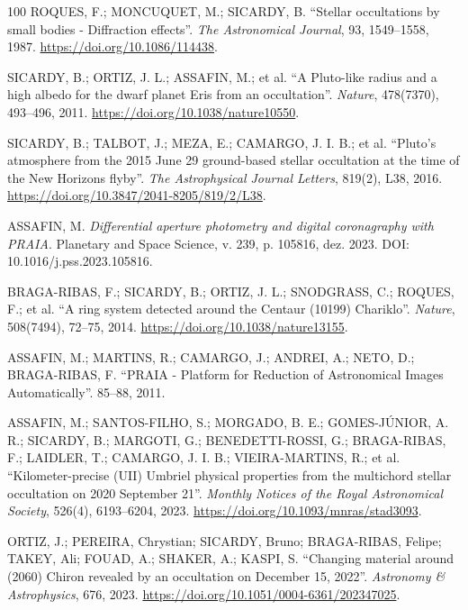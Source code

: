 \documentclass[msc]{on} %
\begin{document}
\begin{thebibliography}{100}
 ROQUES, F.; MONCUQUET, M.; SICARDY, B. ``Stellar occultations by small bodies - Diffraction effects''. \emph{The Astronomical Journal}, 93, 1549--1558, 1987. \url{https://doi.org/10.1086/114438}.

 SICARDY, B.; ORTIZ, J. L.; ASSAFIN, M.; et al. ``A Pluto-like radius and a high albedo for the dwarf planet Eris from an occultation''. \emph{Nature}, 478(7370), 493--496, 2011. \url{https://doi.org/10.1038/nature10550}.

 SICARDY, B.; TALBOT, J.; MEZA, E.; CAMARGO, J. I. B.; et al. ``Pluto's atmosphere from the 2015 June 29 ground-based stellar occultation at the time of the New Horizons flyby''. \emph{The Astrophysical Journal Letters}, 819(2), L38, 2016. \url{https://doi.org/10.3847/2041-8205/819/2/L38}.

 ASSAFIN, M. \textit{Differential aperture photometry and digital coronagraphy with PRAIA}. Planetary and Space Science, v. 239, p. 105816, dez. 2023. DOI: 10.1016/j.pss.2023.105816.

 BRAGA-RIBAS, F.; SICARDY, B.; ORTIZ, J. L.; SNODGRASS, C.; ROQUES, F.; et al. ``A ring system detected around the Centaur (10199) Chariklo''. \emph{Nature}, 508(7494), 72--75, 2014. \url{https://doi.org/10.1038/nature13155}.

 ASSAFIN, M.; MARTINS, R.; CAMARGO, J.; ANDREI, A.; NETO, D.; BRAGA-RIBAS, F. ``PRAIA - Platform for Reduction of Astronomical Images Automatically''. 85--88, 2011.

 ASSAFIN, M.; SANTOS-FILHO, S.; MORGADO, B. E.; GOMES-JÚNIOR, A. R.; SICARDY, B.; MARGOTI, G.; BENEDETTI-ROSSI, G.; BRAGA-RIBAS, F.; LAIDLER, T.; CAMARGO, J. I. B.; VIEIRA-MARTINS, R.; et al. ``Kilometer-precise (UII) Umbriel physical properties from the multichord stellar occultation on 2020 September 21''. \emph{Monthly Notices of the Royal Astronomical Society}, 526(4), 6193–6204, 2023. \url{https://doi.org/10.1093/mnras/stad3093}.

 ORTIZ, J.; PEREIRA, Chrystian; SICARDY, Bruno; BRAGA-RIBAS, Felipe; TAKEY, Ali; FOUAD, A.; SHAKER, A.; KASPI, S. ``Changing material around (2060) Chiron revealed by an occultation on December 15, 2022''. \emph{Astronomy \& Astrophysics}, 676, 2023. \url{https://doi.org/10.1051/0004-6361/202347025}.


\end{thebibliography}
\end{document}
